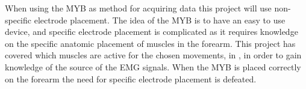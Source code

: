 When using the MYB as method for acquiring data this project will use non-specific electrode placement. The idea of the MYB is to have an easy to use device, and specific electrode placement is complicated as it requires knowledge on the specific anatomic placement of muscles in the forearm. This project has covered which muscles are active for the chosen movements, in , in order to gain knowledge of the source of the EMG signals. When the MYB is placed correctly on the forearm the need for specific electrode placement is defeated. %